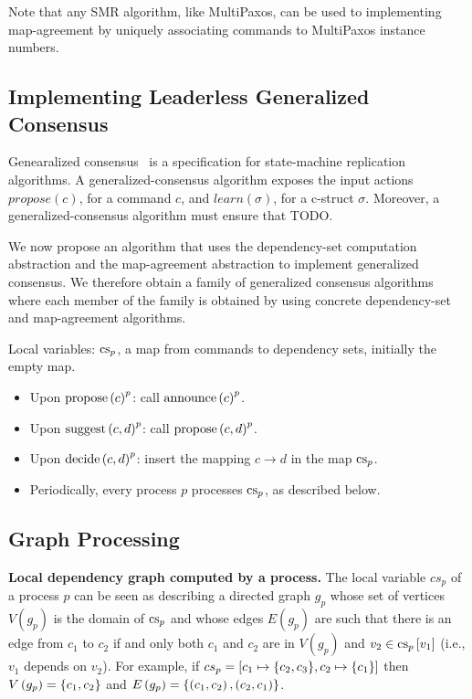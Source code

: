 Note that any SMR algorithm, like MultiPaxos, can be used to implementing map-agreement by uniquely associating commands to MultiPaxos instance numbers.




\subsection{Implementing Leaderless Generalized Consensus}

Genearalized consensus~\cite{Lamport05GeneralizeConsensus} is a specification for state-machine replication algorithms. 
A generalized-consensus algorithm exposes the input actions $propose\left( c \right)$, for a command $c$, and $learn\left( \sigma \right)$, for a c-struct $\sigma$.
Moreover, a generalized-consensus algorithm must ensure that TODO.

We now propose an algorithm that uses the dependency-set computation abstraction and the map-agreement abstraction to implement generalized consensus. We therefore obtain a family of generalized consensus algorithms where each member of the family is obtained by using concrete dependency-set and map-agreement algorithms.


Local variables: $\operatorname{cs}_p$, a map from commands to dependency sets, initially the empty map.
\begin{itemize}[noitemsep,nolistsep]
    \item Upon ${\operatorname{propose}\left( c \right)}^p$: call ${\operatorname{announce}\left( c \right)}^p$.
    \item Upon ${\operatorname{suggest}\left( c,d \right)}^p$: call ${\operatorname{propose}\left( c,d \right)}^p$.
    \item Upon ${\operatorname{decide}\left( c,d \right)}^p$: insert the mapping $c \rightarrow d$ in the map $\operatorname{cs}_p$.
    \item Periodically,  every process $p$ processes $\operatorname{cs}_p$, as described below.
\end{itemize}

\subsection{Graph Processing}
\label{graph-proc}

\textbf{Local dependency graph computed by a process.} The local variable $cs_p$ of a process $p$ can be seen as describing a directed graph $g_p$ whose set of vertices $V\left( g_p \right)$ is the domain of $\operatorname{cs}_p$ and whose edges $E\left( g_p \right)$ are such that there is an edge from $c_1$ to $c_2$ if and only both $c_1$ and $c_2$ are in $V\left( g_p \right)$ and $v_2 \in \operatorname{cs}_p\left[ v_1 \right]$ (i.e., $v_1$ depends on $v_2$). For example, if $cs_p = \left[ c_1 \mapsto \aset{c_2,c_3}, c_2 \mapsto \aset{c_1} \right]$ then $V\left(
g_p \right) = \left\{c_1,c_2\right\}$ and $E\left( g_p \right) = \left\{\left( c_1,c_2 \right),\left( c_2,c_1 \right)\right\}$.

